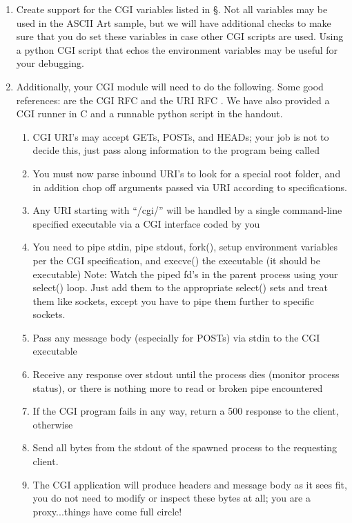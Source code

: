 \begin{enumerate}
  \item Create support for the CGI variables listed in \S\label{sec:cgi-vars}. Not all variables may be used in the ASCII Art sample, but we will have additional checks to make sure that you do set these variables in case other CGI scripts are used. Using a python CGI script that echos the environment variables may be useful for your debugging.
\item Additionally, your CGI module will need to do the following. Some good references: are the CGI RFC \cite{cgirfc} and the URI RFC \cite{urirfc}. We have also provided a CGI runner in C and a runnable python script in the handout. 
\begin{enumerate}
    \item CGI URI's may accept GETs, POSTs, and HEADs; your job is not to decide this, just pass along information to the program being called
    \item You must now parse inbound URI's to look for a special root folder, and in addition chop off arguments passed via URI according to specifications.
    \item Any URI starting with ``/cgi/'' will be handled by a single command-line specified executable via a CGI interface coded by you
    \item You need to pipe stdin, pipe stdout, fork(), setup environment variables per the CGI specification, and execve() the executable (it should be executable) Note: Watch the piped fd's in the parent process using your select() loop. Just add them to the appropriate select() sets and treat them like sockets, except you have to pipe them further to specific sockets.
    \item Pass any message body (especially for POSTs) via stdin to the CGI executable
    \item Receive any response over stdout until the process dies (monitor process status), or there is nothing more to read or broken pipe encountered
    \item If the CGI program fails in any way, return a 500 response to the client, otherwise
    \item Send all bytes from the stdout of the spawned process to the requesting client.
    \item The CGI application will produce headers and message body as it sees fit, you do not need to modify or inspect these bytes at all; you are a proxy...things have come full circle!
\end{enumerate}

\end{enumerate}
